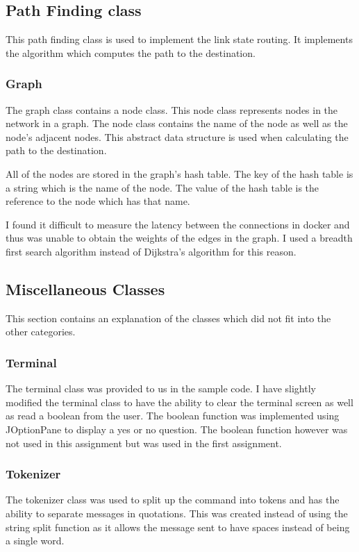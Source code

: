 \documentclass{article}
\begin{document}
\subsection{Path Finding class}
This path finding class is used to implement the link state routing. It
implements the algorithm which computes the path to the destination.

\subsubsection{Graph}
The graph class contains a node class. This node class represents nodes in the
network in a graph. The node class contains the name of the node as well as the
node's adjacent nodes. This abstract data structure is used when calculating the
path to the destination.

All of the nodes are stored in the graph's hash table. The key of the hash
table is a string which is the name of the node. The value of the hash table is
the reference to the node which has that name.

I found it difficult to measure the latency between the connections in docker
and thus was unable to obtain the weights of the edges in the graph. I used a
breadth first search algorithm instead of Dijkstra's algorithm for this reason.

\subsection{Miscellaneous Classes}
This section contains an explanation of the classes which did not fit into the
other categories.

\subsubsection{Terminal}
The terminal class was provided to us in the sample code. I have slightly
modified the terminal class to have the ability to clear the terminal screen
as well as read a boolean from the user. The boolean function was implemented
using JOptionPane to display a yes or no question. The boolean function however
was not used in this assignment but was used in the first assignment.

\subsubsection{Tokenizer}
The tokenizer class was used to split up the command into tokens and has the
ability to separate messages in quotations. This was created instead of using
the string split function as it allows the message sent to have spaces instead
of being a single word.
\end{document}
